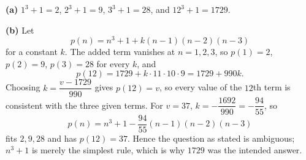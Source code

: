 \textbf{(a)} $1^3+1=2$, $2^3+1=9$, $3^3+1=28$, and $12^3+1=1729$.

\textbf{(b)} Let
\[
p(n)=n^3+1+k(n-1)(n-2)(n-3)
\]
for a constant $k$. The added term vanishes at $n=1,2,3$, so $p(1)=2$, $p(2)=9$, $p(3)=28$ for every $k$, and
\[
p(12)=1729+k\cdot11\cdot10\cdot9=1729+990k .
\]
Choosing $k=\dfrac{v-1729}{990}$ gives $p(12)=v$, so every value of the $12$th term is consistent with the three given terms. For $v=37$, $k=-\dfrac{1692}{990}=-\dfrac{94}{55}$, so
\[
\boxed{p(n)=n^3+1-\dfrac{94}{55}(n-1)(n-2)(n-3)}
\]
fits $2,9,28$ and has $p(12)=37$. Hence the question as stated is ambiguous; $n^3+1$ is merely the simplest rule, which is why $1729$ was the intended answer.
